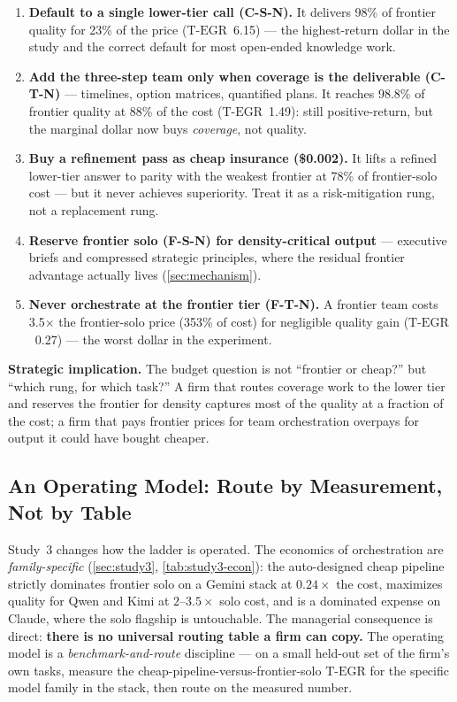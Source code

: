 \documentclass[12pt,a4paper]{article}
\newcommand{\TEGR}{\ensuremath{\text{T-EGR}}}
\begin{document}
\begin{enumerate}[leftmargin=*,nosep]
  \item \textbf{Default to a single lower-tier call (C-S-N).} It delivers 98\%
        of frontier quality for 23\% of the price ($\TEGR$~6.15) --- the
        highest-return dollar in the study and the correct default for most
        open-ended knowledge work.
  \item \textbf{Add the three-step team only when coverage is the deliverable
        (C-T-N)} --- timelines, option matrices, quantified plans. It reaches
        98.8\% of frontier quality at 88\% of the cost ($\TEGR$~1.49): still
        positive-return, but the marginal dollar now buys \emph{coverage}, not
        quality.
  \item \textbf{Buy a refinement pass as cheap insurance (\$0.002).} It lifts a
        refined lower-tier answer to parity with the weakest frontier at 78\% of
        frontier-solo cost --- but it never achieves superiority. Treat it as a
        risk-mitigation rung, not a replacement rung.
  \item \textbf{Reserve frontier solo (F-S-N) for density-critical output} ---
        executive briefs and compressed strategic principles, where the residual
        frontier advantage actually lives (\cref{sec:mechanism}).
  \item \textbf{Never orchestrate at the frontier tier (F-T-N).} A frontier team
        costs 3.5$\times$ the frontier-solo price (353\% of cost) for negligible
        quality gain ($\TEGR$~0.27) --- the worst dollar in the experiment.
\end{enumerate}

\noindent\textbf{Strategic implication.} The budget question is not ``frontier or
cheap?'' but ``which rung, for which task?'' A firm that routes coverage work to
the lower tier and reserves the frontier for density captures most of the quality
at a fraction of the cost; a firm that pays frontier prices for team
orchestration overpays for output it could have bought cheaper.

\subsection{An Operating Model: Route by Measurement, Not by Table}

Study~3 changes how the ladder is operated. The economics of orchestration are
\emph{family-specific} (\cref{sec:study3}, \cref{tab:study3-econ}): the
auto-designed cheap pipeline strictly dominates frontier solo on a Gemini stack
at $0.24\times$ the cost, maximizes quality for Qwen and Kimi at $2$--$3.5\times$
solo cost, and is a dominated expense on Claude, where the solo flagship is
untouchable. The managerial consequence is direct: \textbf{there is no universal
routing table a firm can copy.} The operating model is a \emph{benchmark-and-route}
discipline --- on a small held-out set of the firm's own tasks, measure the
cheap-pipeline-versus-frontier-solo $\TEGR$ for the specific model family in the
stack, then route on the measured number.
\end{document}
